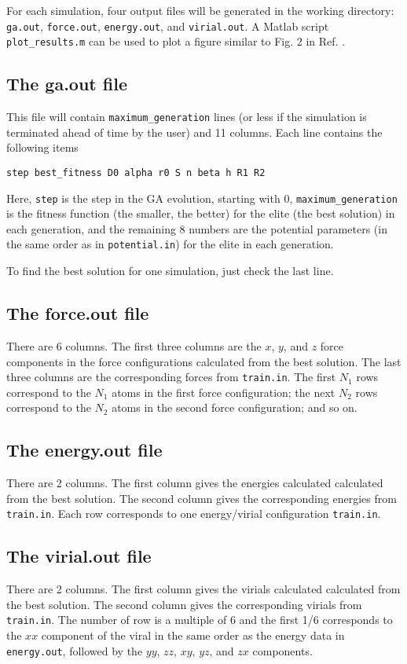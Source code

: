 \documentclass[12pt,a4paper]{report}
\begin{document}
For each simulation, four output files will be generated in the working directory: \verb"ga.out", \verb"force.out", \verb"energy.out", and \verb"virial.out". A Matlab script \verb"plot_results.m" can be used to plot a figure similar to Fig. 2 in Ref. \cite{fan2019arxiv}.

\subsection{The ga.out file}

This file will contain \verb"maximum_generation" lines (or less if the simulation is terminated ahead of time by the user) and 11 columns. Each line contains the following items
\begin{verbatim}
step best_fitness D0 alpha r0 S n beta h R1 R2
\end{verbatim}
Here, \verb"step" is the step in the GA evolution, starting with 0, \verb"maximum_generation" is the fitness function (the smaller, the better) for the elite (the best solution) in each generation, and the remaining 8 numbers are the potential parameters (in the same order as in \verb"potential.in") for the elite in each generation.

To find the best solution for one simulation, just check the last line.

\subsection{The force.out file}

There are 6 columns. The first three columns are the $x$, $y$, and $z$ force components in the force configurations calculated from the best solution. The last three columns are the corresponding forces from \verb"train.in". The first $N_1$ rows correspond to the $N_1$ atoms in the first force configuration; the next $N_2$ rows correspond to the $N_2$ atoms in the second force configuration; and so on.

\subsection{The energy.out file}

There are 2 columns. The first column gives the energies calculated calculated from the best solution. The second column gives the corresponding energies from \verb"train.in". Each row corresponds to one energy/virial configuration \verb"train.in".

\subsection{The virial.out file}

There are 2 columns. The first column gives the virials calculated calculated from the best solution. The second column gives the corresponding virials from \verb"train.in". The number of row is a multiple of 6 and the first 1/6 corresponds to the $xx$ component of the viral in the same order as the energy data in \verb"energy.out", followed by the $yy$, $zz$, $xy$, $yz$, and $zx$ components.




\end{document}
